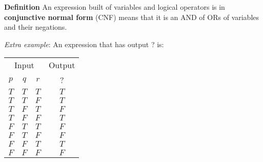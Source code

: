\documentclass[12pt, oneside]{article}
\begin{document}
{\bf  Definition} An expression built of variables and logical 
operators is in {\bf conjunctive normal form}  (CNF) means
that it is an AND of ORs of variables and their negations.
 



{\it Extra example}: An expression that has output ? is: 

\begin{tabular}{ccc||c}
    \multicolumn{3}{c||}{Input}  & Output\\
    $p$ & $q$ & $r$  &  ?\\
    \hline
    $T$ & $T$  & $T$ & $T$ \\
    $T$ & $T$  & $F$ & $T$ \\
    $T$ & $F$  & $T$ & $F$ \\
    $T$ & $F$  & $F$ & $T$ \\
    $F$ & $T$  & $T$ & $F$ \\
    $F$ & $T$  & $F$ & $F$ \\
    $F$ & $F$  & $T$ & $T$ \\
    $F$ & $F$  & $F$ & $F$ \\
\end{tabular}

\vfill

 \newpage
\end{document}

